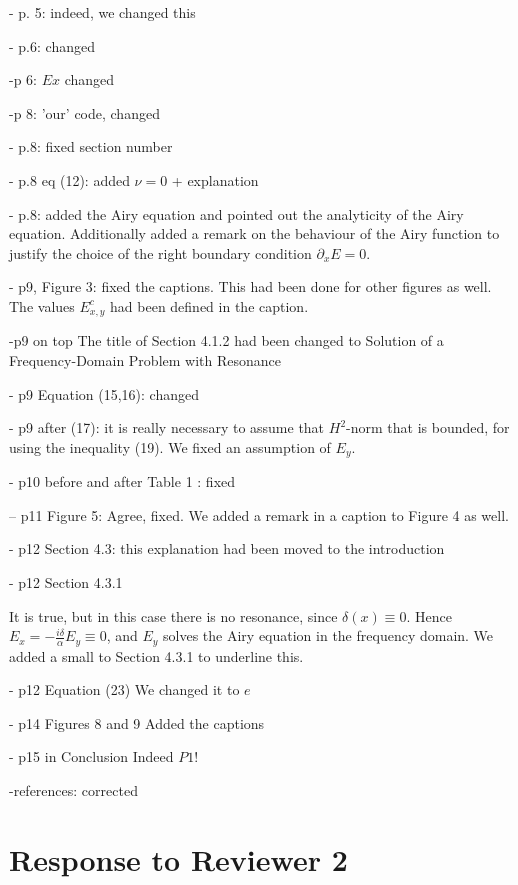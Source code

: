 \documentclass[a4paper,10pt]{article}
\begin{document}
- p. 5: indeed, we changed this 

- p.6:  changed

-p 6: $Ex$ changed

-p 8: 'our' code, changed

 - p.8: fixed section number
 
 - p.8 eq (12): added $\nu=0$ + explanation
 
 - p.8: added the Airy equation and pointed out the analyticity of the Airy equation. Additionally added a remark on the behaviour of the Airy function to justify the choice of the right boundary 
 condition $\partial_x E=0$. 
 
 -  p9, Figure 3: fixed the captions. This had been done for other figures as well. The values $E^{c}_{x,y}$ had been defined in the caption.
 
 -p9 on top
  The title of Section 4.1.2 had been changed to Solution of a Frequency-Domain Problem with Resonance
  
 - p9 Equation (15,16): changed  

 - p9 after (17): it is really necessary to assume that $H^2$-norm that is bounded, for using the inequality (19). 
 We fixed an assumption of $E_y$.


  
 - p10 before and after Table 1 : fixed
 
 -- p11 Figure 5:
Agree, fixed. We added a remark in a caption to Figure 4 as well.



- p12 Section 4.3: this explanation had been moved to the introduction



- p12 Section 4.3.1

  It is true, but in this case there is no resonance, since $\delta(x)\equiv 0$. Hence $E_x=-\frac{i\delta}{\alpha}E_y\equiv 0$, 
  and $E_y$ solves the Airy equation in the frequency domain. We added a small to Section 4.3.1 to underline this. 

  
- p12 Equation (23)
We changed it to $e$
  
- p14 Figures 8 and 9
Added the captions  


- p15 in Conclusion
  Indeed $P1$!
  
 -references: corrected
  

\section{Response to  Reviewer 2}
 
\end{document}
